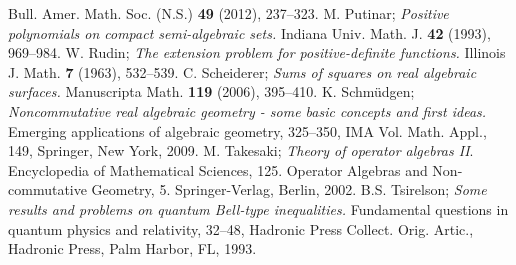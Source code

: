 \documentclass[12pt]{amsart}
\theoremstyle{definition}
\begin{document}
\begin{thebibliography}{MM}
Bull. Amer. Math. Soc. (N.S.) \textbf{49} (2012), 237--323.
 M. Putinar;
\emph{Positive polynomials on compact semi-algebraic sets.}
Indiana Univ. Math. J. \textbf{42} (1993), 969--984.
 W. Rudin;
\emph{The extension problem for positive-definite functions.}
Illinois J. Math. \textbf{7} (1963), 532--539.
 C. Scheiderer;
\emph{Sums of squares on real algebraic surfaces.}
Manuscripta Math. \textbf{119} (2006), 395--410.
 K. Schm\"udgen;
\emph{Noncommutative real algebraic geometry - some basic concepts and first ideas.}
Emerging applications of algebraic geometry, 325--350, IMA Vol. Math. Appl., 149, Springer, New York, 2009.
 M. Takesaki;
\emph{Theory of operator algebras II}.
Encyclopedia of Mathematical Sciences, 125.
Operator Algebras and Non-commutative Geometry, 5. Springer-Verlag, Berlin, 2002.
 B.S. Tsirelson;
\emph{Some results and problems on quantum Bell-type inequalities.}
Fundamental questions in quantum physics and relativity, 32--48,
Hadronic Press Collect. Orig. Artic., Hadronic Press, Palm Harbor, FL, 1993.
\end{thebibliography}
\end{document}
